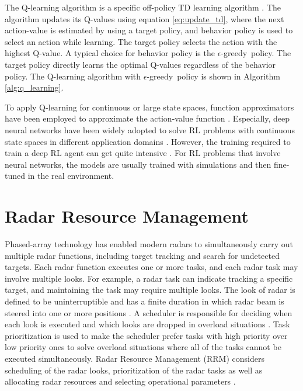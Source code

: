 \documentclass[english, 12pt, a4paper, elec, utf8, a-1b, online]{aaltothesis}
\newcommand{\egreedy}{$\epsilon$-greedy~}
\begin{document}
The Q-learning algorithm is a specific off-policy TD learning algorithm \cite{Sutton2018}.
The algorithm updates its Q-values using equation \eqref{eq:update_td}, where the next action-value is estimated by using a target policy, 
and behavior policy is used to select an action while learning. 
The target policy selects the action with the highest Q-value.
A typical choice for behavior policy is the \egreedy policy. 
The target policy directly learns the optimal Q-values regardless of the behavior policy. 
The Q-learning algorithm with \egreedy policy is shown in Algorithm \ref{alg:q_learning}.

To apply Q-learning for continuous or large state spaces, function approximators have been employed to approximate the action-value function \cite{Sutton2018}. 
Especially, deep neural networks have been widely adopted to solve RL problems with continuous state spaces in different application domains \cite{Mnih2013, Zhang2018, Luong2018}.
However, the training required to train a deep RL agent can get quite intensive \cite{Mnih2013}.
For RL problems that involve neural networks, the models are usually trained with simulations and then fine-tuned in the real environment.


\clearpage
\section{Radar Resource Management} \label{sec:existing_RRM}


Phased-array technology has enabled modern radars to simultaneously carry out multiple radar functions, including target tracking and search for undetected targets.
Each radar function executes one or more tasks, and each radar task may involve multiple looks.
For example, a radar task can indicate tracking a specific target, and maintaining the task may require multiple looks.
The look of radar is defined to be uninterruptible and has a finite duration in which radar beam is steered into one or more positions \cite{Moo2016}.
A scheduler is responsible for deciding when each look is executed and which looks are dropped in overload situations \cite{Moo2016}. 
Task prioritization is used to make the scheduler prefer tasks with high priority over low priority ones to solve overload situations where all of the tasks cannot be executed simultaneously.
Radar Resource Management (RRM) considers scheduling of the radar looks, prioritization of the radar tasks as well as allocating radar resources and selecting operational parameters \cite{Moo2016}. 
\end{document}
